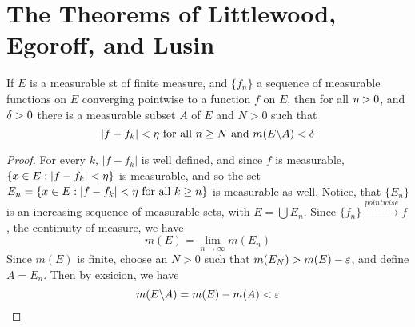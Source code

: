 \section{The Theorems of Littlewood, Egoroff, and Lusin}

\begin{lemma}\label{3.3.1}
    If $E$ is a measurable st of finite measure, and  $\{f_n\}$ a sequence of
    measurable functions on $E$ converging pointwise to a function  $f$ on  $E$,
    then for all  $\eta>0$, and $\delta>0$  there is a measurable subset $A$ of  $E$
    and  $N>0$ such that
    \begin{equation*}
        |f-f_k|<\eta \text{ for all } n \geq N \text{ and } m(E\backslash A)<\delta
    \end{equation*}
\end{lemma}
\begin{proof}
    For every $k$,  $|f-f_k|$ is well defined, and since  $f$ is measurable,
    $\{x \in E : |f-f_k|<\eta\}$ is measurable, and so the set $E_n=\{x \in E :
    |f-f_k|<\eta \text{ for all } k \geq n\}$ is measurable as well. Notice, that
    $\{E_n\}$ is an increasing sequence of measurable sets, with
    $E=\bigcup{E_n}$. Since $\{f_n\} \xrightarrow{pointwise} f$, the continuity
    of measure, we have
    \begin{equation*}
        m(E)=\lim_{n \xrightarrow{} \infty}{m(E_n)}
    \end{equation*}
    Since $m(E)$ is finite, choose an $N>0$ such that  $m(E_N)>m(E)-\varepsilon$, and
    define $A=E_n$. Then by exsicion, we have
    \begin{equation*}
        m(E\backslash A)=m(E)-m(A)<\varepsilon
    \end{equation*}
\end{proof}

